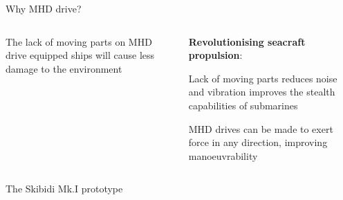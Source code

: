 \documentclass[mathserif]{beamer}
\begin{document}
\begin{frame}[t]{}
\begin{columns}[T]
\begin{column}{0.65\textwidth}
\begin{block}{Why MHD drive?}
\begin{columns}[T]
\begin{column}{0.5\textwidth}
\begin{outline}
\begin{center}
\begin{tikzpicture}
					\end{tikzpicture}	
					\end{center}		
					\1 The lack of moving parts on MHD drive equipped ships will cause less damage to the environment
				\end{outline}
				\end{column}
				\begin{column}{0.5\textwidth}
				{\Huge \textbf{Revolutionising seacraft propulsion}:}
				\hfill \break
				\begin{outline}
					\1 Lack of moving parts reduces noise and vibration improves the stealth capabilities of submarines
					\begin{center}		
				\end{center}	
				\1 MHD drives can be made to exert force in any direction, improving manoeuvrability	
				\end{outline}				
				\end{column}
				\end{columns}
				\end{block}
				\begin{block}{The Skibidi Mk.I prototype}	
					\begin{center}		
				\end{center}
			\end{block}						
		\end{column}	
	\end{columns}
\end{frame}
\end{document}
